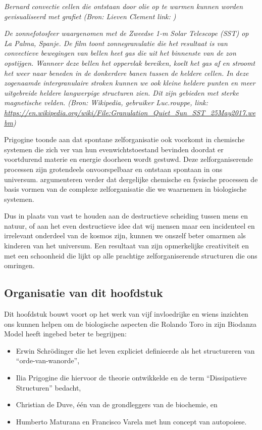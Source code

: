 \documentclass[
  11pt,
]{book}
\begin{document}
\emph{Bernard convectie cellen die ontstaan door olie op te warmen kunnen worden gevisualiseerd met grafiet (Bron: Lieven Clement link: )}

\emph{De zonnefotosfeer waargenomen met de Zweedse 1-m Solar Telescope (SST) op La Palma, Spanje. De film toont zonnegranulatie die het resultaat is van convectieve bewegingen van bellen heet gas die uit het binnenste van de zon opstijgen. Wanneer deze bellen het oppervlak bereiken, koelt het gas af en stroomt het weer naar beneden in de donkerdere banen tussen de heldere cellen. In deze zogenaamde intergranulaire stroken kunnen we ook kleine heldere punten en meer uitgebreide heldere langwerpige structuren zien. Dit zijn gebieden met sterke magnetische velden. (Bron: Wikipedia, gebruiker Luc.rouppe, link: \url{https://en.wikipedia.org/wiki/File:Granulation_Quiet_Sun_SST_25May2017.webm})}

Prigogine toonde aan dat spontane zelforganisatie ook voorkomt in chemische systemen die zich ver van hun evenwichtstoestand bevinden doordat er voortdurend materie en energie doorheen wordt gestuwd. Deze zelforganiserende processen zijn grotendeels onvoorspelbaar en ontstaan spontaan in ons universum. \citet{prigogineStengers1984} argumenteren verder dat dergelijke chemische en fysische processen de basis vormen van de complexe zelforganisatie die we waarnemen in biologische systemen.

Dus in plaats van vast te houden aan de destructieve scheiding tussen mens en natuur, of aan het even destructieve idee dat wij mensen maar een incidenteel en irrelevant onderdeel van de kosmos zijn, kunnen we onszelf beter omarmen als kinderen van het universum. Een resultaat van zijn opmerkelijke creativiteit en met een schoonheid die lijkt op alle prachtige zelforganiserende structuren die ons omringen.

\hypertarget{organisatie-van-dit-hoofdstuk}{%
\subsection{Organisatie van dit hoofdstuk}\label{organisatie-van-dit-hoofdstuk}}

Dit hoofdstuk bouwt voort op het werk van vijf invloedrijke en wiens inzichten ons kunnen helpen om de biologische aspecten die Rolando Toro in zijn Biodanza Model heeft ingebed beter te begrijpen:

\begin{itemize}
\item
  Erwin Schrödinger die het leven expliciet definieerde als het structureren van ``orde-van-wanorde'',
\item
  Ilia Prigogine die hiervoor de theorie ontwikkelde en de term ``Dissipatieve Structuren'' bedacht,
\item
  Christian de Duve, één van de grondleggers van de biochemie, en
\item
  Humberto Maturana en Francisco Varela met hun concept van autopoiese.
\end{itemize}
\end{document}
